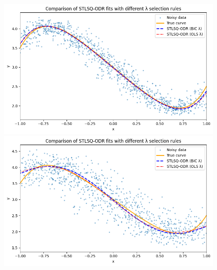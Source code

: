 \begin{figure}
\begin{minipage}{0.45\textwidth}
    \centering
    \includegraphics[width=\linewidth]{MSc_Statistics_Research_Report_Template/images/0.1, 0.1.png}
\end{minipage}
\begin{minipage}{0.45\textwidth}
    \centering
    \includegraphics[width=\linewidth]{MSc_Statistics_Research_Report_Template/images/0.2, 0.2.png}
\end{minipage}


\end{figure}

